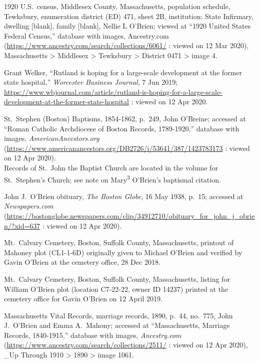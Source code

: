 \begin{thebibliography}{999}
	1920 U.S.\ census, Middlesex County, Massachusetts, population schedule, Tewksbury, enumeration district (ED) 471, sheet 2B, institution: State Infirmary, dwelling [blank], family [blank], Nellie L O'Brien; viewed at ``1920 United States Federal Census,'' database with images, Ancestry.com (\url{https://www.ancestry.com/search/collections/6061/} : viewed on 12 Mar 2020), Massachusetts > Middlesex > Tewksbury > District 0471 > image 4.
	
	Grant Welker, ``Rutland is hoping for a large-scale development at the former state hospital,'' \textit{Worcester Business Journal}, 7 Jun 2019;  \url{https://www.wbjournal.com/article/rutland-is-hoping-for-a-large-scale-development-at-the-former-state-hospital} : viewed on 12 Apr 2020.
	
	St.\ Stephen (Boston) Baptisms, 1854-1862, p.\ 249, John O'Breine; accessed at ``Roman Catholic Archdiocese of Boston Records, 1789-1920,'' database with images, \textit{AmericanAncestors.org} (\url{https://www.americanancestors.org/DB2726/i/53641/387/1423783173} : viewed on 12 Apr 2020).\\
	Records of St.\ John the Baptist Church are located in the volume for St.\ Stephen's Church; see note on Mary\textsuperscript{3} O'Brien's baptismal citation.
	
	John J.\ O'Brien obituary, \textit{The Boston Globe}, 16 May 1938, p.\ 15; accessed at \textit{Newspapers.com} (\url{https://bostonglobe.newspapers.com/clip/34912710/obituary_for_john_j_obrien/?xid=637} : viewed on 12 Apr 2020).
	
	Mt.\ Calvary Cemetery, Boston, Suffolk County, Massachusetts, printout of Mahoney plot (CL1-1-6D) originally given to Michael O'Brien and verified by Gavin O'Brien at the cemetery office, 28 Dec 2018.
	
	Mt.\ Calvary Cemetery, Boston, Suffolk County, Massachusetts, listing for William O'Brien plot (location C7-22-22, owner ID 14237) printed at the cemetery office for Gavin O'Brien on 12 April 2019.
	
	Massachusetts Vital Records, marriage records, 1890, p.\ 44, no.\ 775, John J.\ O'Brien and Emma A.\ Mahony; accessed at ``Massachusetts, Marriage Records, 1840-1915,'' database with images, \textit{Ancestry.com} (\url{https://www.ancestry.com/search/collections/2511/} : viewed on 12 Apr 2020), \_Up Through 1910 > 1890 > image 1061.
	

\end{thebibliography}
